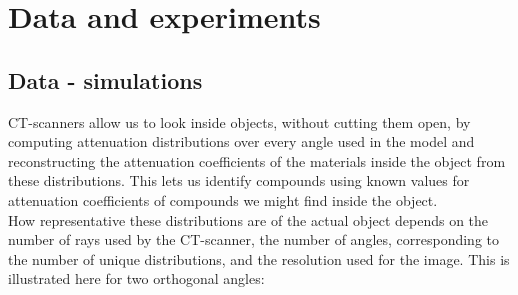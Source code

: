 \documentclass{article}
\begin{document}
\section{Data and experiments}
\vspace*{-0.3\baselineskip}
\subsection{Data - simulations}
CT-scanners allow us to look inside objects, without cutting them open, by computing attenuation distributions over every angle used in the model and reconstructing the attenuation coefficients of the materials inside the object from these distributions. This lets us identify compounds using known values for attenuation coefficients of compounds we might find inside the object. \\ 
How representative these distributions are of the actual object depends on the number of rays used by the CT-scanner, the number of angles, corresponding to the number of unique distributions, and the resolution used for the image. This is illustrated here for two orthogonal angles:
\end{document}
